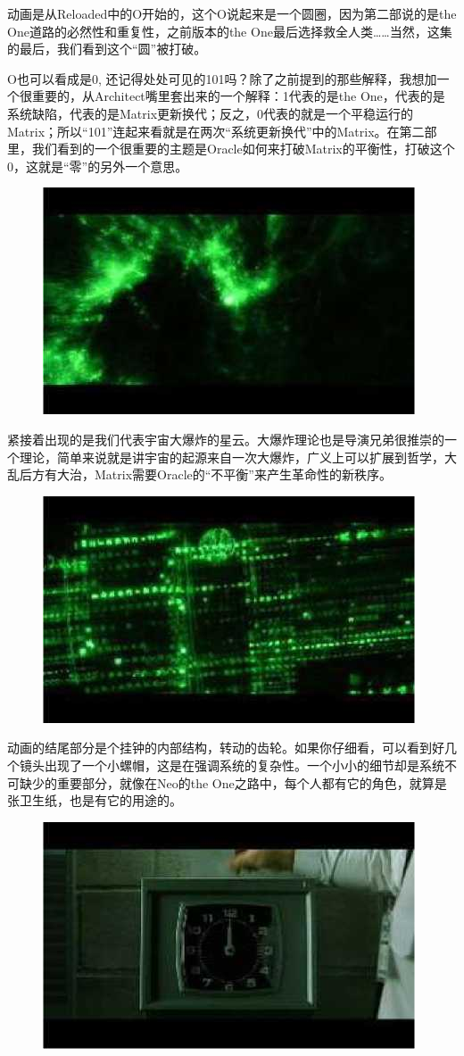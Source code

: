 \documentclass{ctexart}
\begin{document}
动画是从Reloaded中的O开始的，这个O说起来是一个圆圈，因为第二部说的是the One道路的必然性和重复性，之前版本的the One最后选择救全人类……当然，这集的最后，我们看到这个“圆”被打破。

O也可以看成是0, 还记得处处可见的101吗？除了之前提到的那些解释，我想加一个很重要的，从Architect嘴里套出来的一个解释：1代表的是the One，代表的是系统缺陷，代表的是Matrix更新换代；反之，0代表的就是一个平稳运行的Matrix；所以“101”连起来看就是在两次“系统更新换代”中的Matrix。在第二部里，我们看到的一个很重要的主题是Oracle如何来打破Matrix的平衡性，打破这个0，这就是“零”的另外一个意思。

\begin{figure}[htb]
\centering
\includegraphics[width=0.5\linewidth]{fig/read_reloaded-2}
\end{figure}

紧接着出现的是我们代表宇宙大爆炸的星云。大爆炸理论也是导演兄弟很推崇的一个理论，简单来说就是讲宇宙的起源来自一次大爆炸，广义上可以扩展到哲学，大乱后方有大治，Matrix需要Oracle的“不平衡”来产生革命性的新秩序。

\begin{figure}[htb]
\centering
\includegraphics[width=0.5\linewidth]{fig/read_reloaded-3}
\end{figure}

动画的结尾部分是个挂钟的内部结构，转动的齿轮。如果你仔细看，可以看到好几个镜头出现了一个小螺帽，这是在强调系统的复杂性。一个小小的细节却是系统不可缺少的重要部分，就像在Neo的the One之路中，每个人都有它的角色，就算是张卫生纸，也是有它的用途的。

\begin{figure}[htb]
\centering
\includegraphics[width=0.5\linewidth]{fig/read_reloaded-4}
\end{figure}
\end{document}
